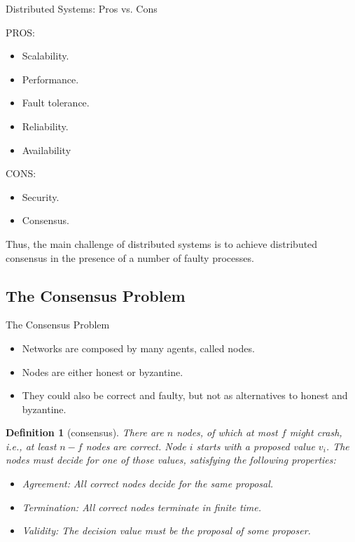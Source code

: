 \documentclass[usenames,dvipsnames]{beamer}
\newtheorem{mydef}{\alert{Definition}}[section]
\begin{document}
    \begin{frame}{Distributed Systems: Pros vs. Cons}
        \begin{minipage}[t]{0.5\linewidth}
        \noindent
        \alert{PROS:}
        \begin{itemize}
            \item Scalability.
            \item Performance.
            \item Fault tolerance.
            \item Reliability.
            \item Availability
        \end{itemize}
        \end{minipage}\hfill
        \begin{minipage}[t]{0.5\linewidth}
        \noindent
        \alert{CONS:}
        \begin{itemize}
            \item Security.
            \item Consensus.
        \end{itemize}
        \end{minipage}
        
        \bigskip
        Thus, the main challenge of distributed systems is to achieve \alert{distributed consensus} in the presence of a number of \alert{faulty processes}.
    \end{frame}
     
    \subsection{The Consensus Problem}  
    \begin{frame}{The Consensus Problem}
        \begin{itemize}
            \item Networks are composed by many agents, called \alert{nodes}.
            \item Nodes are either \alert{honest} or \alert{byzantine}.
            \item They could also be \alert{correct} and \alert{faulty}, but not as alternatives to honest and byzantine.
        \end{itemize}
        \begin{mydef}[consensus]
            There are $n$ nodes, of which at most $f$ might crash, i.e., at least $n-f$ nodes are correct. Node $i$ starts with a proposed value $v_{i}$. The nodes must decide for one of those values, satisfying the following properties:
            \begin{itemize}
                \item Agreement: All correct nodes decide for the same proposal.
                \item Termination: All correct nodes terminate in finite time.
                \item Validity: The decision value must be the proposal of some proposer.
            \end{itemize}
        \end{mydef}
    \end{frame}
        
\end{document}
